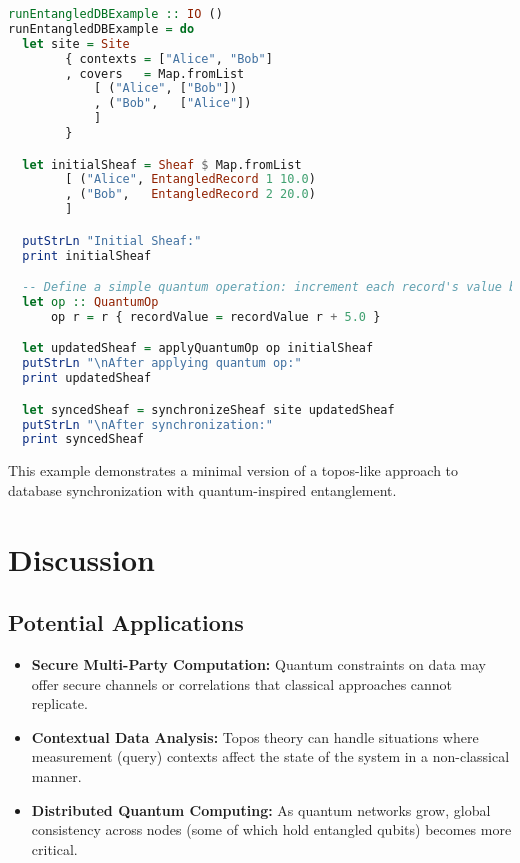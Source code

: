 \documentclass[11pt]{article}
\begin{document}
\begin{lstlisting}[language=Haskell, caption={A toy example combining the site, sheaf, quantum operation, and synchronization.}]
runEntangledDBExample :: IO ()
runEntangledDBExample = do
  let site = Site
        { contexts = ["Alice", "Bob"]
        , covers   = Map.fromList
            [ ("Alice", ["Bob"])
            , ("Bob",   ["Alice"])
            ]
        }

  let initialSheaf = Sheaf $ Map.fromList
        [ ("Alice", EntangledRecord 1 10.0)
        , ("Bob",   EntangledRecord 2 20.0)
        ]

  putStrLn "Initial Sheaf:"
  print initialSheaf

  -- Define a simple quantum operation: increment each record's value by 5.
  let op :: QuantumOp
      op r = r { recordValue = recordValue r + 5.0 }

  let updatedSheaf = applyQuantumOp op initialSheaf
  putStrLn "\nAfter applying quantum op:"
  print updatedSheaf

  let syncedSheaf = synchronizeSheaf site updatedSheaf
  putStrLn "\nAfter synchronization:"
  print syncedSheaf
\end{lstlisting}

\noindent This example demonstrates a minimal version of a topos-like approach to database synchronization with quantum-inspired entanglement.

\section{Discussion}\label{sec:discussion}
\subsection{Potential Applications}
\begin{itemize}
    \item \textbf{Secure Multi-Party Computation:} Quantum constraints on data may offer secure channels or correlations that classical approaches cannot replicate.
    \item \textbf{Contextual Data Analysis:} Topos theory can handle situations where measurement (query) contexts affect the state of the system in a non-classical manner.
    \item \textbf{Distributed Quantum Computing:} As quantum networks grow, global consistency across nodes (some of which hold entangled qubits) becomes more critical.
\end{itemize}
\end{document}
